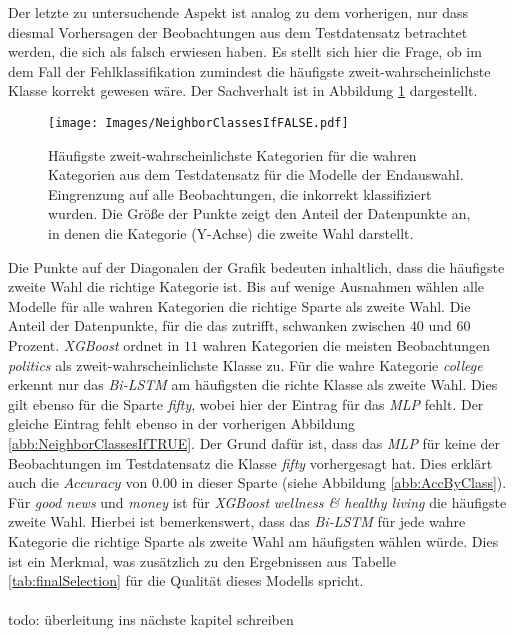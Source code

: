\documentclass[a4paper,11pt]{article}
\begin{document}
Der letzte zu untersuchende Aspekt ist analog zu dem vorherigen, nur dass diesmal Vorhersagen der Beobachtungen aus dem Testdatensatz betrachtet werden, die sich als falsch erwiesen haben. Es stellt sich hier die Frage, ob im dem Fall der Fehlklassifikation zumindest die häufigste zweit-wahrscheinlichste Klasse korrekt gewesen wäre. Der Sachverhalt ist in Abbildung \ref{abb:NeighborClassesIfFALSE} dargestellt.

\begin{figure}[ht]
    \centering
\texttt{[image: Images/NeighborClassesIfFALSE.pdf]} 
\caption{Häufigste zweit-wahrscheinlichste Kategorien für die wahren Kategorien aus dem Testdatensatz für die Modelle der Endauswahl. Eingrenzung auf alle Beobachtungen, die inkorrekt klassifiziert wurden. Die Größe der Punkte zeigt den Anteil der Datenpunkte an, in denen die Kategorie (Y-Achse) die zweite Wahl darstellt.}
\label{abb:NeighborClassesIfFALSE}
\end{figure}

Die Punkte auf der Diagonalen der Grafik bedeuten inhaltlich, dass die häufigste zweite Wahl die richtige Kategorie ist. Bis auf wenige Ausnahmen wählen alle Modelle für alle wahren Kategorien die richtige Sparte als zweite Wahl. Die Anteil der Datenpunkte, für die das zutrifft, schwanken zwischen $40$ und $60$ Prozent. \textit{XGBoost} ordnet in $11$ wahren Kategorien die meisten Beobachtungen \textit{politics} als zweit-wahrscheinlichste Klasse zu. Für die wahre Kategorie \textit{college} erkennt nur das \textit{Bi-LSTM} am häufigsten die richte Klasse als zweite Wahl. Dies gilt ebenso für die Sparte \textit{fifty}, wobei hier der Eintrag für das \textit{MLP} fehlt. Der gleiche Eintrag fehlt ebenso in der vorherigen Abbildung \ref{abb:NeighborClassesIfTRUE}. Der Grund dafür ist, dass das \textit{MLP} für keine der Beobachtungen im Testdatensatz die Klasse \textit{fifty} vorhergesagt hat. Dies erklärt auch die $Accuracy$ von $0.00$ in dieser Sparte (siehe Abbildung \ref{abb:AccByClass}). Für \textit{good news} und \textit{money} ist für \textit{XGBoost} \textit{wellness \& healthy living} die häufigste zweite Wahl. Hierbei ist bemerkenswert, dass das \textit{Bi-LSTM} für jede wahre Kategorie die richtige Sparte als zweite Wahl am häufigsten wählen würde. Dies ist ein Merkmal, was zusätzlich zu den Ergebnissen aus Tabelle \ref{tab:finalSelection} für die Qualität dieses Modells spricht.\\
\\
todo: überleitung ins nächste kapitel schreiben
\end{document}
